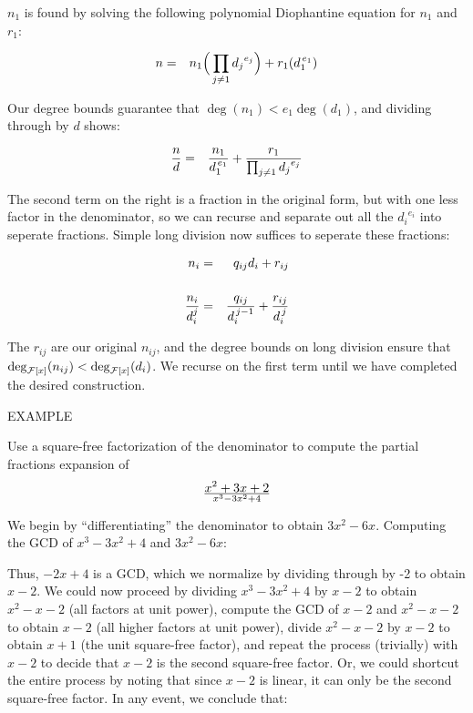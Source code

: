$n_1$ is found by solving the following polynomial Diophantine
equation for $n_1$ and $r_1$:

\begin{eqnarray*}
n &=& n_1 \Big( \prod_{j\ne 1} {d_j}^{e_j} \Big) + r_1 (d_1^{\,e_1}) \cr
\end{eqnarray*}

Our degree bounds guarantee that
$\deg(n_1) < e_1\deg(d_1)$, and dividing through by $d$ shows:

\begin{eqnarray*}
{n\over d} &=& {{n_1}\over{d_1^{\,e_1}}} + {r_1\over{\prod_{j\ne 1} {d_j}^{e_j}}} \cr
\end{eqnarray*}

The second term on the right is a fraction in the original form,
but with one less factor in the denominator, so we can recurse
and separate out all the ${d_i}^{e_i}$ into seperate fractions.
Simple long division now suffices to seperate these fractions:

\begin{eqnarray*}
n_i &=& q_{ij} d_i + r_{ij} \cr\cr
{{n_i}\over{d_i^j}} &=& {{q_{ij}}\over{d_i^{\,j-1}}} + {r_{ij}\over{d_i^{\,j}}} \cr
\end{eqnarray*}

The $r_{ij}$ are our original $n_{ij}$, and the degree bounds on long
division ensure that $\deg_{{\cal F}[x]}(n_{ij}) < \deg_{{\cal F}[x]}(d_i)$.
We recurse on the first term until we have completed the desired construction.

\vfill\eject

EXAMPLE

Use a square-free factorization of the denominator to compute the partial fractions expansion of $${x^2 + 3x + 2}\over{x^3-3x^2+4}$$

We begin by ``differentiating'' the denominator to obtain $3x^2-6x$.
Computing the GCD of $x^3-3x^2+4$ and $3x^2-6x$:



Thus, $-2x+4$ is a GCD, which we normalize by dividing through by -2
to obtain $x-2$.  We could now proceed by dividing $x^3-3x^2+4$ by
$x-2$ to obtain $x^2-x-2$ (all factors at unit power), compute the GCD
of $x-2$ and $x^2-x-2$ to obtain $x-2$ (all higher factors at unit
power), divide $x^2-x-2$ by $x-2$ to obtain $x+1$ (the unit
square-free factor), and repeat the process (trivially) with $x-2$ to
decide that $x-2$ is the second square-free factor.  Or, we could
shortcut the entire process by noting that since $x-2$ is linear,
it can only be the second square-free factor.  In any event, we conclude that:


